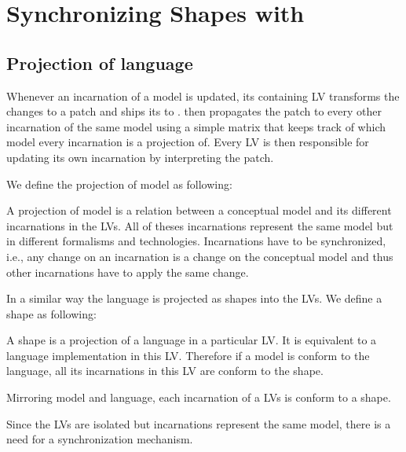 \section{Synchronizing Shapes with \prism}
\label{sec:prism}

\subsection{Projection of language}

Whenever an incarnation of a model is updated, its containing LV transforms the changes to a patch and ships its to \prism.
\prism then propagates the patch to every other incarnation of the same model using a simple matrix that keeps track of which model every incarnation is a projection of.
Every LV is then responsible for updating its own incarnation by interpreting the patch.

We define the projection of model as following:
\begin{definition}
	A projection of model is a relation between a conceptual model and its different incarnations in the LVs.
	All of theses incarnations represent the same model but in different formalisms and technologies.
	Incarnations have to be synchronized, i.e., any change on an incarnation is a change on the conceptual model and thus other incarnations have to apply the same change.
\end{definition}
In a similar way the language is projected as shapes into the LVs.
We define a shape as following:
\begin{definition}
	A shape is a projection of a language in a particular LV.
	It is equivalent to a language implementation in this LV.
	Therefore if a model is conform to the language, all its incarnations in this LV are conform to the shape.
\end{definition}
Mirroring model and language, each incarnation of a LVs is conform to a shape.

Since the LVs are isolated but incarnations represent the same model, there is a need for a synchronization mechanism.


